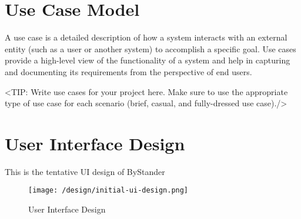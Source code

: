 \section{Use Case Model}
\label{section:use-case-model}
A use case is a detailed description of how a system
interacts with an external entity (such as a user or another system) to
accomplish a specific goal. Use cases provide a high-level view of the
functionality of a system and help in capturing and documenting its
requirements from the perspective of end users.

<TIP: Write use cases for your project here. Make sure to use the
appropriate type of use case for each scenario (brief, casual, and fully-dressed
use case)./>

\section{User Interface Design}
\label{section:user-interface-design}
This is the tentative UI design of ByStander

\begin{figure}[h]
    \centering
    \texttt{[image: /design/initial-ui-design.png]}
    \caption{User Interface Design}
\end{figure}